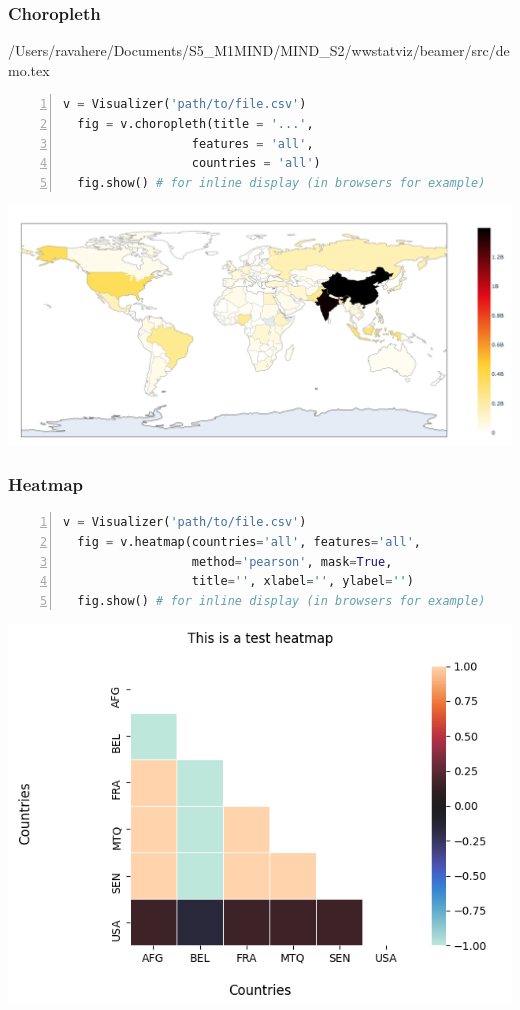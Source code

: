 \begin{frame}
  \frametitle{Choropleth}/Users/ravahere/Documents/S5_M1MIND/MIND_S2/wwstatviz/beamer/src/demo.tex

  \begin{lstlisting}[language=Python,numbers=left]
  v = Visualizer('path/to/file.csv')
  fig = v.choropleth(title = '...',
                  features = 'all',
                  countries = 'all')
  fig.show() # for inline display (in browsers for example)
  \end{lstlisting}

  \includegraphics[scale=0.4]{../inc/graphics/choropleth.png}
  
\end{frame}

\begin{frame}
  \frametitle{Heatmap}

  \begin{lstlisting}[language=Python,numbers=left]
  v = Visualizer('path/to/file.csv')
  fig = v.heatmap(countries='all', features='all',
                  method='pearson', mask=True,
                  title='', xlabel='', ylabel='')
  fig.show() # for inline display (in browsers for example)
  \end{lstlisting}
  
  \includegraphics[scale=0.4]{../inc/graphics/heatmap.png}

\end{frame}

